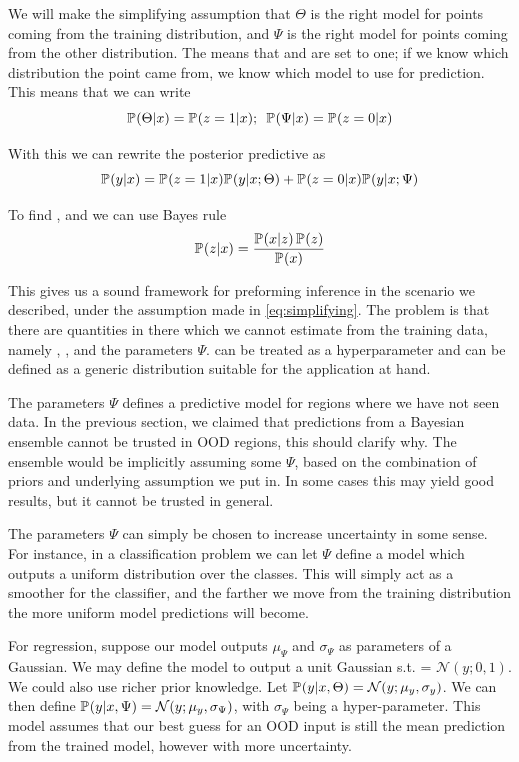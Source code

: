 \documentclass[../main.tex]{subfiles}
\begin{document}
We will make the simplifying assumption that $\Theta$ is the right model for points coming from the training distribution, and $\Psi$ is the right model for points coming from the other distribution. The means that  and  are set to one; if we know which distribution the point came from, we know which model to use for prediction. This means that we can write
\begin{equation}
    \label{eq:simplifying}
    \mathbb{P}_{}(\Theta|x) = \mathbb{P}_{}(z=1|x) ;\,\,\, \mathbb{P}_{}(\Psi|x) = \mathbb{P}_{}(z=0|x)
\end{equation}{}

With this we can rewrite the posterior predictive as
\begin{equation}
    \label{eq:final_posterior}
    \mathbb{P}_{}(y|x) = \mathbb{P}_{}(z=1|x) \mathbb{P}_{}(y| x; \Theta) + \mathbb{P}_{}(z=0|x) \mathbb{P}_{}(y | x; \Psi)
\end{equation}{}

To find , and we can use Bayes rule
$$ 
    \mathbb{P}_{}(z|x) = \frac{\mathbb{P}_{}(x|z) \, \mathbb{P}_{}(z)}{\mathbb{P}_{}(x)}
$$

This gives us a sound framework for preforming inference in the scenario we described, under the assumption made in \cref{eq:simplifying}. The problem is that there are quantities in there which we cannot estimate from the training data, namely , , and the parameters $\Psi$.  can be treated as a hyperparameter and  can be defined as a generic distribution suitable for the application at hand.

The parameters $\Psi$ defines a predictive model for regions where we have not seen data. In the previous section, we claimed that predictions from a Bayesian ensemble cannot be trusted in OOD regions, this should clarify why. The ensemble would be implicitly assuming some $\Psi$, based on the combination of priors and underlying assumption we put in. In some cases this may yield good results, but it cannot be trusted in general. 

The parameters $\Psi$ can simply be chosen to increase uncertainty in some sense. For instance, in a classification problem we can let $\Psi$ define a model which outputs a uniform distribution over the classes. This will simply act as a smoother for the classifier, and the farther we move from the training distribution the more uniform model predictions will become. 

For regression, suppose our model outputs $\mu_\Psi$ and $\sigma_\Psi$ as parameters of a Gaussian. We may define the model to output a unit Gaussian s.t.  = $\mathcal{N}(y; 0, 1)$. We could also use richer prior knowledge. Let $\mathbb{P}_{}(y|x, \Theta) = \mathcal{N}(y; \mu_y, \sigma_y)$. We can then define $\mathbb{P}_{}(y|x, \Psi) = \mathcal{N}(y; \mu_y, \sigma_\Psi)$, with $\sigma_\Psi$ being a hyper-parameter. This model assumes that our best guess for an OOD input is still the mean prediction from the trained model, however with more uncertainty. 
\end{document}
